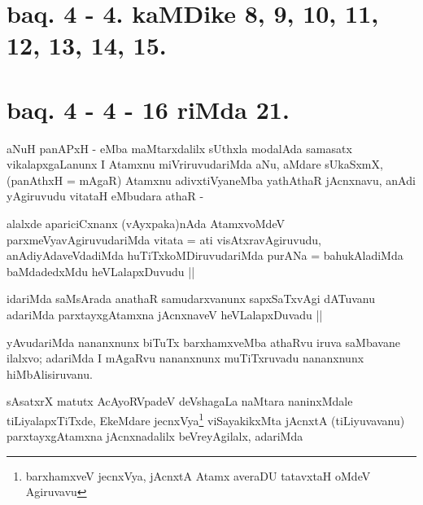 \section*{baq. 4 - 4. kaMDike 8, 9, 10, 11, 12, 13, 14, 15.}

\stext

\section*{baq. 4 - 4 - 16 riMda 21.}


\begin{artha}
aNuH panAPxH - eMba maMtarxdalilx sUthxla modalAda samasatx
vikalapxgaLanunx I Atamxnu miVriruvudariMda aNu, aMdare sUkaSxmX,
(panAthxH = mAgaR) Atamxnu adivxtiVyaneMba yathAthaR jAcnxnavu, anAdi
yAgiruvudu vitataH eMbudara athaR -
\end{artha}

\begin{artha}
alalxde apariciCxnanx (vAyxpaka)nAda AtamxvoMdeV
parxmeVyavAgiruvudariMda vitata = ati visAtxravAgiruvudu,
anAdiyAdaveVdadiMda huTiTxkoMDiruvudariMda purANa = bahukAladiMda
baMdadedxMdu heVLalapxDuvudu ||
\end{artha}


\begin{artha}
idariMda saMsArada anathaR samudarxvanunx sapxSaTxvAgi dATuvanu
adariMda parxtayxgAtamxna jAcnxnaveV heVLalapxDuvadu ||
\end{artha}

\begin{artha}
yAvudariMda nananxnunx biTuTx barxhamxveMba athaRvu iruva saMbavane
ilalxvo; adariMda I mAgaRvu nananxnunx muTiTxruvadu nananxnunx hiMbAlisiruvanu.
\end{artha}


\begin{artha}
sAsatxrX matutx AcAyoRVpadeV deVshagaLa naMtara naninxMdale
tiLiyalapxTiTxde, EkeMdare jecnxVya\footnote{barxhamxveV jecnxVya,
  jAcnxtA Atamx averaDU tatavxtaH oMdeV Agiruvavu} viSayakikxMta jAcnxtA
(tiLiyuvavanu) parxtayxgAtamxna jAcnxnadalilx beVreyAgilalx, adariMda 
\end{artha}

